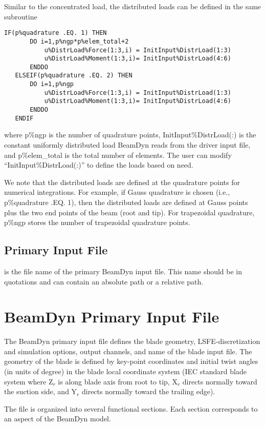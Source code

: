 Similar to the concentrated load, the distributed loads can be defined in the same subroutine
\begin{lstlisting}[frame = single]
   IF(p%quadrature .EQ. 1) THEN
       DO i=1,p%ngp*p%elem_total+2
           u%DistrLoad%Force(1:3,i) = InitInput%DistrLoad(1:3)
           u%DistrLoad%Moment(1:3,i)= InitInput%DistrLoad(4:6)
       ENDDO
   ELSEIF(p%quadrature .EQ. 2) THEN
       DO i=1,p%ngp
           u%DistrLoad%Force(1:3,i) = InitInput%DistrLoad(1:3)
           u%DistrLoad%Moment(1:3,i)= InitInput%DistrLoad(4:6)
       ENDDO
   ENDIF
\end{lstlisting}
where p\%ngp is the number of quadrature points, InitInput\%DistrLoad(:) is the constant uniformly distributed load BeamDyn reads from the driver input file, and p\%elem\_total is the total number of elements. 
The user can modify ``InitInput\%DistrLoad(:)'' to define the loads based on need. 

We note that the distributed loads are defined at the quadrature points for numerical integrations. 
For example, if Gauss quadrature is chosen (i.e., p\%quadrature .EQ. 1), then the distributed loads are defined at Gauss points plus the two end points of the beam (root and tip).  For trapezoidal quadrature, p\%ngp stores the number of trapezoidal quadrature points.

\subsection{Primary Input File}
 is the file name of the primary BeamDyn input file. 
This name should be in quotations and can contain an absolute path or a relative path. 

\section{BeamDyn Primary Input File}

The BeamDyn primary input file defines the blade geometry, LSFE-discretization and simulation options, output channels, and name of the blade input file. 
The geometry of the blade is defined by key-point coordinates and initial twist angles (in units of degree) in the blade local coordinate system (IEC standard blade system where Z$_r$ is along blade axis from root to tip, X$_r$ directs normally toward the suction side, and Y$_r$ directs normally toward the trailing edge).

The file is organized into several functional sections. 
Each section corresponds to an aspect of the BeamDyn model.

